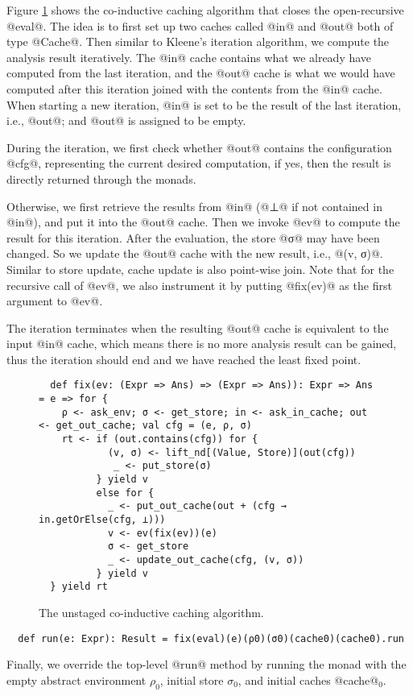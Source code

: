 Figure \ref{fig:coind_cache} shows the co-inductive caching algorithm that
closes the open-recursive @eval@.
The idea is to first set up two caches called @in@ and @out@ both of type
@Cache@. Then similar to Kleene's iteration algorithm, we compute the analysis
result iteratively. The @in@ cache contains what we already have computed from
the last iteration, and the @out@ cache is what we would have computed after this
iteration joined with the contents from the @in@ cache.
When starting a new iteration, @in@ is set to be the result of the last
iteration, i.e., @out@; and @out@ is assigned to be empty.

During the iteration, we first check whether @out@ contains the configuration
@cfg@, representing the current desired computation, if
yes, then the result is directly returned through the monads.

Otherwise, we first retrieve the results from @in@ (@⊥@ if not contained in
@in@), and put it into the @out@ cache.
Then we invoke @ev@ to compute the result for this iteration.
After the evaluation, the store @σ@ may have been changed. So we update the
@out@ cache with the new result, i.e., @(v, σ)@. Similar to store update, cache
update is also point-wise join.
Note that for the recursive call of @ev@, we also instrument it by putting
@fix(ev)@ as the first argument to @ev@.

The iteration terminates when the resulting @out@ cache is equivalent to the
input @in@ cache, which means there is no more analysis result can be gained,
thus the iteration should end and we have reached the least fixed point.

\begin{figure}[t!]
  \centering
\begin{lstlisting}
  def fix(ev: (Expr => Ans) => (Expr => Ans)): Expr => Ans = e => for {
    ρ <- ask_env; σ <- get_store; in <- ask_in_cache; out <- get_out_cache; val cfg = (e, ρ, σ)
    rt <- if (out.contains(cfg)) for {
            (v, σ) <- lift_nd[(Value, Store)](out(cfg))
             _ <- put_store(σ)
          } yield v
          else for {
            _ <- put_out_cache(out + (cfg → in.getOrElse(cfg, ⊥)))
            v <- ev(fix(ev))(e)
            σ <- get_store
            _ <- update_out_cache(cfg, (v, σ))
          } yield v
  } yield rt
\end{lstlisting}
\vspace{-1em}
\caption{The unstaged co-inductive caching algorithm.}
\label{fig:coind_cache}
\end{figure}

\begin{lstlisting}
  def run(e: Expr): Result = fix(eval)(e)(ρ0)(σ0)(cache0)(cache0).run
\end{lstlisting}

Finally, we override the top-level @run@ method by running the monad with
the empty abstract environment $\rho_0$, initial store $\sigma_0$, and initial
caches @cache@$_0$.
